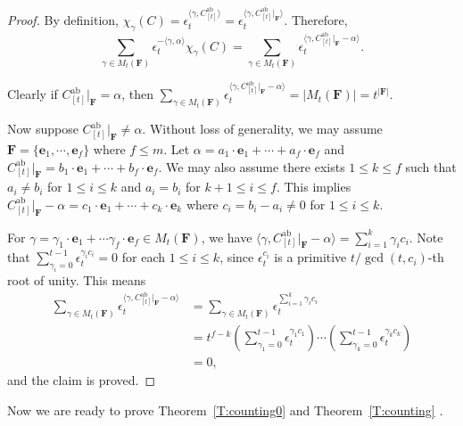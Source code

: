 \documentclass[11pt]{amsart}
\theoremstyle{plain}
\theoremstyle{definition}
\newcommand{\ve}{{\mathbf e}}
\newcommand{\vF}{{\mathbf F}}
\DeclareMathOperator{\ab}{\operatorname{ab}}
\numberwithin{equation}{section}
\begin{document}
\begin{proof}
By definition, $\chi_\gamma(C) =\epsilon_t^{\langle\gamma, C^{\ab}_{[t]}\rangle}=\epsilon_t^{\langle\gamma, C^{\ab}_{[t]}|_\vF\rangle}$. Therefore, 
$$\sum_{\gamma\in M_t(\vF)}\epsilon_t^{-\langle\gamma, \alpha\rangle}\chi_\gamma(C)=\sum_{\gamma\in M_t(\vF)}\epsilon_t^{\langle\gamma, C^{\ab}_{[t]}|_\vF-\alpha\rangle}.$$ 

Clearly if $C^{\ab}_{[t]}|_\vF=\alpha$, then $\sum_{\gamma\in M_t(\vF)}\epsilon_t^{\langle\gamma, C^{\ab}_{[t]}|_\vF-\alpha\rangle}=|M_t(\vF)|=t^{|\vF|}$. 

Now suppose  $C^{\ab}_{[t]}|_\vF\neq\alpha$. Without loss of generality, we may assume $\vF=\{\ve_1,\cdots, \ve_f\}$ where $f\leq m$. Let $\alpha=a_1\cdot \ve_1+\cdots + a_f\cdot \ve_f$ and $C^{\ab}_{[t]}|_\vF=b_1\cdot \ve_1+\cdots + b_f\cdot \ve_f$.  We may also assume there exists $1\leq k \leq f$ such that $a_i\neq b_i$ for $1\leq i\leq k$ and $a_i = b_i$ for $k+1\leq i\leq f$. This implies  $ C^{\ab}_{[t]}|_\vF-\alpha=c_1 \cdot \ve_1+\cdots +c_k\cdot \ve_k$ where $c_i=b_i-a_i\neq 0$ for $1\leq i\leq k$. 

For $\gamma = \gamma_1\cdot \ve_1+\cdots \gamma_f\cdot \ve_f\in M_t(\vF)$, we have 
$\langle\gamma, C^{\ab}_{[t]}|_\vF-\alpha\rangle = \sum_{i=1}^k \gamma_ic_i$. Note that $\sum_{\gamma_i=0}^{t-1}\epsilon_t^{\gamma_ic_i}=0$ for each $1\leq i \leq k$,  since $\epsilon_t^{c_i}$ is a primitive $t/\gcd(t,c_i)$-th root of unity. This means
\begin{align*}
\sum_{\gamma\in M_t(\vF)}\epsilon_t^{\langle\gamma, C^{\ab}_{[t]}|_\vF-\alpha\rangle}&=\sum_{\gamma\in M_t(\vF)}\epsilon_t^{\sum_{i=1}^k \gamma_ic_i} \\
&=t^{f-k}\left(\sum_{\gamma_1=0}^{t-1}\epsilon_t^{\gamma_1c_1}\right)\cdots \left(\sum_{\gamma_k=0}^{t-1}\epsilon_t^{\gamma_kc_k}\right)\\
&=0, 
\end{align*}
and the claim is proved. 
\end{proof}




Now we are ready to prove Theorem~\ref{T:counting0} and Theorem~\ref{T:counting} . 
\end{document}
